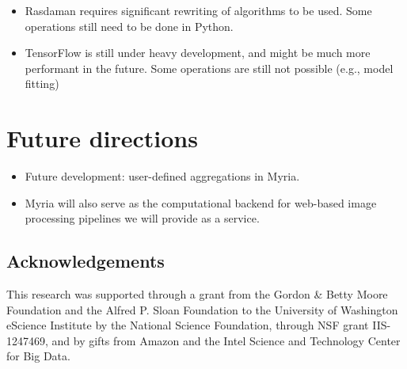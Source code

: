 \documentclass[a0,landscape]{a0poster}
\begin{document}
\begin{multicols}{3}
\begin{itemize}
\item Rasdaman requires significant rewriting of algorithms to be used. Some operations still need to be done in Python.

\item TensorFlow is still under heavy development, and might be much more performant in the future. Some operations are still not possible (e.g., model fitting)

\end{itemize}

\color{DarkSlateGray} %


\section*{Future directions}
\begin{itemize}

\item Future development: user-defined aggregations in Myria.

\item Myria will also serve as the computational backend for web-based image processing pipelines we will provide as a service.

\end{itemize}

\nocite{*} %
\footnotesize  %

\subsection*{Acknowledgements}
\footnotesize
This research was supported through a grant from the Gordon \& Betty Moore
Foundation and the Alfred P. Sloan Foundation to the University of Washington
eScience Institute by the National Science Foundation, through NSF grant
IIS-1247469, and by gifts from Amazon and the Intel Science and Technology
Center for Big Data.


\end{multicols}
\end{document}
